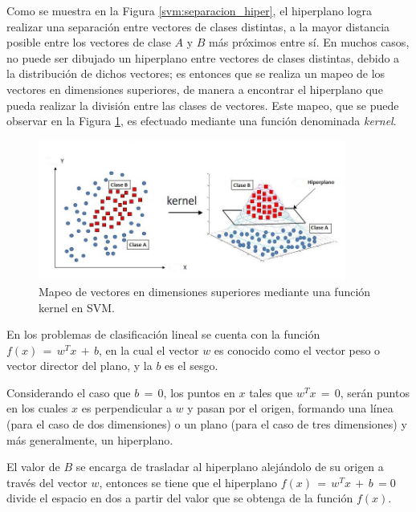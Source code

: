 {Como se muestra en la Figura \ref{svm:separacion_hiper}, el hiperplano logra realizar una separaci\'on entre vectores de clases distintas, a la mayor distancia posible entre los vectores de clase $A$ y $B$ m\'as pr\'oximos entre s\'i. En muchos casos, no puede ser dibujado un hiperplano entre vectores de clases distintas, debido a la distribuci\'on de dichos vectores; es entonces que se realiza un mapeo de los vectores en dimensiones superiores, de manera a encontrar el hiperplano que pueda realizar la divisi\'on entre las clases de vectores. Este mapeo, que se puede observar en la Figura \ref{svm:kernel}, es efectuado mediante una funci\'on denominada \textit{kernel}.
\newline

\begin{figure}[h]
\centering
\includegraphics[width=0.9\textwidth]{kernel.png}
\caption{Mapeo de vectores en dimensiones superiores mediante una funci\'on kernel en SVM.}
\label{svm:kernel}
\end{figure}

En los problemas de clasificaci\'on lineal se cuenta con la funci\'on $f(x) \, = \, w^{T}x \, + \, b
$, en la cual el vector $w$ es conocido como el vector peso o vector director del plano, y la $b$ es el sesgo.
\newline

Considerando el caso que $b \, = \, 0$, los puntos en $x$ tales que $w^{T}x \, = \, 0$, ser\'an puntos en los cuales $x$ es perpendicular a $w$ y pasan por el origen, formando una l\'inea (para el caso de dos dimensiones) o un plano (para el caso de tres dimensiones) y m\'as generalmente, un hiperplano.
\newline

El valor de $B$ se encarga de trasladar al hiperplano alej\'andolo de su origen a trav\'es del vector $w$, entonces se tiene que el hiperplano $f(x) \, = \, w^{T}x \, + \, b \, = 0$ divide el espacio en dos a partir del valor que se obtenga de la funci\'on $f(x)$.
\newline

}
